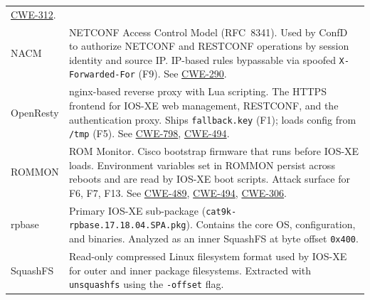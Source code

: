 \documentclass[11pt,a4paper]{article}
\begin{document}
\begin{longtable}{@{}lL{11cm}@{}}
               \href{https://cwe.mitre.org/data/definitions/312.html}{CWE-312}. \\[0.3em]
  NACM       & NETCONF Access Control Model (RFC~8341). Used by ConfD to authorize
               NETCONF and RESTCONF operations by session identity and source IP.
               IP-based rules bypassable via spoofed \texttt{X-Forwarded-For} (F9).
               See \href{https://cwe.mitre.org/data/definitions/290.html}{CWE-290}. \\[0.3em]
  OpenResty  & nginx-based reverse proxy with Lua scripting. The HTTPS frontend for
               IOS-XE web management, RESTCONF, and the authentication proxy.
               Ships \texttt{fallback.key} (F1); loads config from \texttt{/tmp} (F5).
               See \href{https://cwe.mitre.org/data/definitions/798.html}{CWE-798},
               \href{https://cwe.mitre.org/data/definitions/494.html}{CWE-494}. \\[0.3em]
  ROMMON     & ROM Monitor. Cisco bootstrap firmware that runs before IOS-XE loads.
               Environment variables set in ROMMON persist across reboots and are
               read by IOS-XE boot scripts. Attack surface for F6, F7, F13.
               See \href{https://cwe.mitre.org/data/definitions/489.html}{CWE-489},
               \href{https://cwe.mitre.org/data/definitions/494.html}{CWE-494},
               \href{https://cwe.mitre.org/data/definitions/306.html}{CWE-306}. \\[0.3em]
  rpbase     & Primary IOS-XE sub-package (\texttt{cat9k-rpbase.17.18.04.SPA.pkg}).
               Contains the core OS, configuration, and binaries. Analyzed as an
               inner SquashFS at byte offset \texttt{0x400}. \\[0.3em]
  SquashFS   & Read-only compressed Linux filesystem format used by IOS-XE for
               outer and inner package filesystems. Extracted with
               \texttt{unsquashfs} using the \texttt{-offset} flag. \\
\end{longtable}
\end{document}
